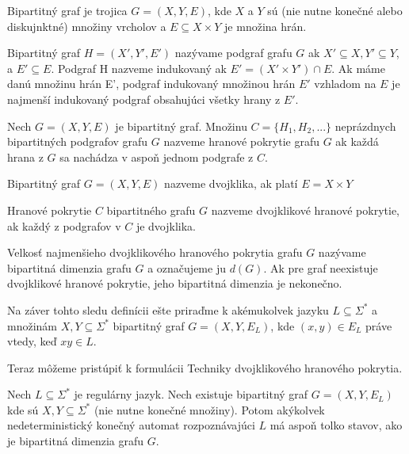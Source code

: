 \begin{definition}
Bipartitný graf je trojica $ G = (X,Y,E) $, kde $ X $ a $ Y $ sú (nie nutne konečné alebo diskujnktné) množiny vrcholov a $ E \subseteq X \times Y $ je množina hrán.
\end{definition}

\begin{definition}
Bipartitný graf $ H = (X',Y',E') $ nazývame podgraf grafu $ G $ ak $ X' \subseteq X, Y' \subseteq Y $, a $ E' \subseteq E $. Podgraf H nazveme indukovaný ak $ E' = (X' \times Y') \cap E $. Ak máme danú množinu hrán E', podgraf indukovaný množinou hrán $ E' $ vzhladom na $ E $ je najmenší indukovaný podgraf obsahujúci všetky hrany z $ E' $.
\end{definition}

\begin{definition}
Nech $ G = (X,Y,E) $ je bipartitný graf. Množinu $ C = \lbrace H_1,H_2,... \rbrace $ neprázdnych bipartitných podgrafov grafu $ G $ nazveme hranové pokrytie grafu $ G $ ak každá hrana z $ G $ sa nachádza v aspoň jednom podgrafe z $ C $. 
\end{definition}

\begin{definition}
Bipartitný graf $ G = (X,Y,E) $ nazveme dvojklika, ak platí $ E = X \times Y $
\end{definition}

\begin{definition}
Hranové pokrytie $ C $ bipartitného grafu $ G $ nazveme dvojklikové hranové pokrytie, ak každý z podgrafov v $ C $ je dvojklika.
\end{definition}

\begin{definition}
Velkosť najmenšieho dvojklikového hranového pokrytia grafu $ G $ nazývame bipartitná dimenzia grafu $ G $ a označujeme ju $ d(G) $. Ak pre graf neexistuje dvojklikové hranové pokrytie, jeho bipartitná dimenzia je nekonečno.
\end{definition}

Na záver tohto sledu definícii ešte priraďme k akémukolvek jazyku $ L \subseteq \Sigma^* $ a množinám $ X,Y \subseteq  \Sigma^* $ bipartitný graf $ G = (X,Y,E_L) $, kde $ (x,y) \in E_L $ práve vtedy, keď $ xy \in L $.
\par
Teraz môžeme pristúpiť k formulácii Techniky dvojklikového hranového pokrytia.
\begin{theorem}
\label{thm:biclique_edge_cover_technique}
Nech $ L \subseteq \Sigma^{*} $ je regulárny jazyk. Nech existuje bipartitný graf $ G = (X,Y,E_L) $ kde sú $ X,Y \subseteq  \Sigma^* $ (nie nutne konečné množiny). Potom akýkolvek nedeterministický konečný automat rozpoznávajúci $ L $ má aspoň tolko stavov, ako je bipartitná dimenzia grafu $ G $.
\end{theorem}

